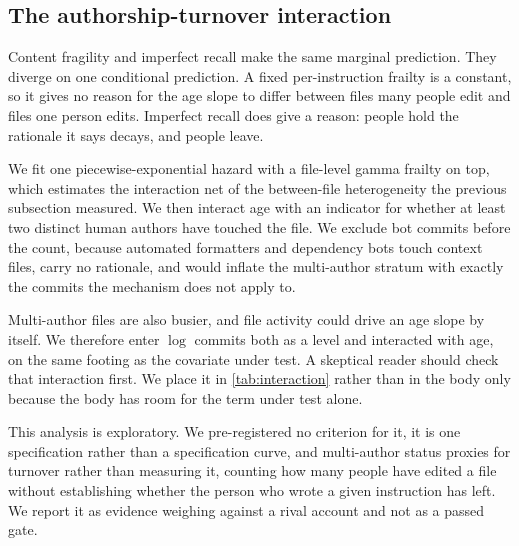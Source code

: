 \subsection{The authorship-turnover interaction}
\label{sec:appendix:interaction}



Content fragility and imperfect recall make the same marginal prediction. They diverge on one
conditional prediction. A fixed per-instruction frailty is a constant, so it gives no reason for
the age slope to differ between files many people edit and files one person edits. Imperfect
recall does give a reason: people hold the rationale it says decays, and people leave.

We fit one piecewise-exponential hazard with a file-level gamma frailty on top, which estimates the
interaction net of the between-file heterogeneity the previous subsection measured. We then
interact age with an indicator for whether at least two distinct human authors have touched the
file. We exclude bot commits before the count, because automated formatters and dependency bots
touch context files, carry no rationale, and would inflate the multi-author stratum with exactly
the commits the mechanism does not apply to.

Multi-author files are also busier, and file activity could drive an age slope by itself. We
therefore enter $\log$ commits both as a level and interacted with age, on the same footing as the
covariate under test. A skeptical reader should check that interaction first. We place it in
\autoref{tab:interaction} rather than in the body only because the body has room for the term
under test alone.

This analysis is exploratory. We pre-registered no criterion for it, it is one specification
rather than a specification curve, and multi-author status proxies for turnover rather than
measuring it, counting how many people have edited a file without establishing whether the person
who wrote a given instruction has left. We report it as evidence weighing against a rival account
and not as a passed gate.
